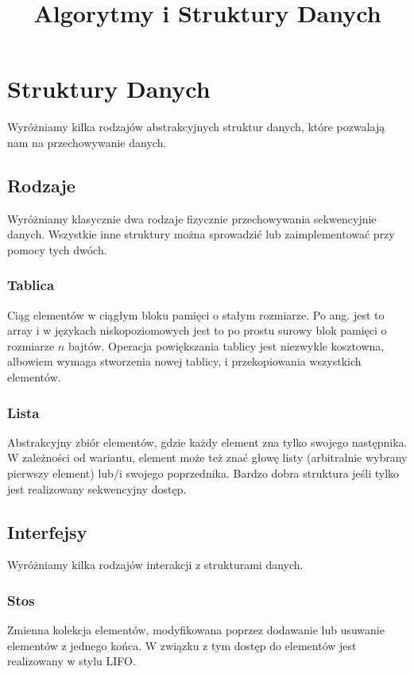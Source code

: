 \documentclass{../notatki}
\title{Algorytmy i Struktury Danych}
\begin{document}
\tableofcontents

\section{Struktury Danych}

Wyróżniamy kilka rodzajów abstrakcyjnych struktur danych, które pozwalają nam
na przechowywanie danych.

\subsection{Rodzaje}

Wyróżniamy klasycznie dwa rodzaje fizycznie przechowywania sekwencyjnie danych.
Wszystkie inne struktury można sprowadzić lub zaimplementować przy pomocy tych
dwóch.

\subsubsection{Tablica}

Ciąg elementów w ciągłym bloku pamięci o stałym rozmiarze. Po ang. jest to array
i w językach niskopoziomowych jest to po prostu surowy blok pamięci o rozmiarze
$n$ bajtów. Operacja powiększania tablicy jest niezwykle kosztowna, albowiem
wymaga stworzenia nowej tablicy, i przekopiowania wszystkich elementów.

\subsubsection{Lista}

Abstrakcyjny zbiór elementów, gdzie każdy element zna tylko swojego następnika.
W zależności od wariantu, element może też znać głowę listy (arbitralnie wybrany
pierwszy element) lub/i swojego poprzednika. Bardzo dobra struktura jeśli
tylko jest realizowany sekwencyjny dostęp.

\subsection{Interfejsy}

Wyróżniamy kilka rodzajów interakcji z strukturami danych.

\subsubsection{Stos}

Zmienna kolekcja elementów, modyfikowana poprzez dodawanie lub
usuwanie elementów
z jednego końca. W związku z tym dostęp do elementów jest realizowany w stylu
LIFO.
\end{document}
